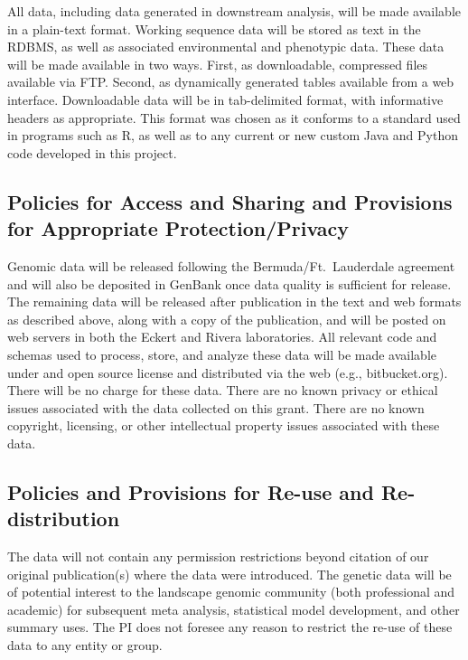All data, including data generated in downstream analysis, will be made available in a plain-text format.  Working sequence
data will be stored as text in the RDBMS, as well as associated environmental and phenotypic data.  These data will be 
made available in two ways.  First, as downloadable, compressed files available via FTP.  Second, as dynamically generated
tables available from a web interface.  Downloadable data will be in tab-delimited format, with informative headers 
as appropriate.  This format was chosen as it conforms to a standard used in programs such as R, as well as to any 
current or new custom Java and Python code developed in this project.

\subsection*{Policies for Access and Sharing and Provisions for Appropriate Protection/Privacy}
Genomic data will be released following the Bermuda/Ft.\ Lauderdale agreement and will also be deposited in 
GenBank once data quality is sufficient for release. The remaining data will be released after publication in the 
text and web formats as described above, along with a copy of the publication, and will be posted on web servers in both
the Eckert and Rivera laboratories. All relevant code and schemas used to process, store, and analyze these data will 
be made available under and open source license and distributed via the web (e.g., bitbucket.org).  There will be no 
charge for these data. There are no known privacy or ethical issues associated with the data collected on this grant. 
There are no known copyright, licensing, or other intellectual property issues associated with these data.

\subsection*{Policies and Provisions for Re-use and Re-distribution}
The data will not contain any permission restrictions beyond citation of our original publication(s) where the data 
were introduced. The genetic data will be of potential interest to the landscape genomic community (both 
professional and academic) for subsequent meta analysis, statistical model development, and other summary 
uses. The PI does not foresee any reason to restrict the re-use of these data to any entity or group.

